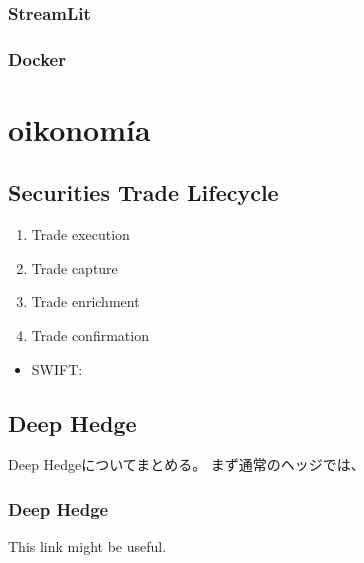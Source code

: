 \documentclass[letterpaper,10pt,english]{sphinxmanual}
\begin{document}
\subsection{StreamLit}
\label{\detokenize{src/MLApp/index:streamlit}}

\subsection{Docker}
\label{\detokenize{src/MLApp/index:docker}}

\chapter{oikonomía}
\label{\detokenize{index:oikonomia}}
\sphinxstepscope


\section{Securities Trade Lifecycle}
\label{\detokenize{src/securitiestradelifecycle/index:securities-trade-lifecycle}}\label{\detokenize{src/securitiestradelifecycle/index::doc}}\begin{enumerate}
%
\item {} 
\sphinxAtStartPar
Trade execution

\item {} 
\sphinxAtStartPar
Trade capture

\item {} 
\sphinxAtStartPar
Trade enrichment

\item {} 
\sphinxAtStartPar
Trade confirmation

\end{enumerate}
\begin{itemize}
\item {} 
\sphinxAtStartPar
SWIFT:

\end{itemize}

\sphinxstepscope


\section{Deep Hedge}
\label{\detokenize{src/deephedge/index:deep-hedge}}\label{\detokenize{src/deephedge/index::doc}}
\sphinxAtStartPar
Deep Hedgeについてまとめる。
まず通常のヘッジでは、


\subsection{Deep Hedge}
\label{\detokenize{src/deephedge/index:id1}}
\sphinxAtStartPar
This link might be useful.
\end{document}
